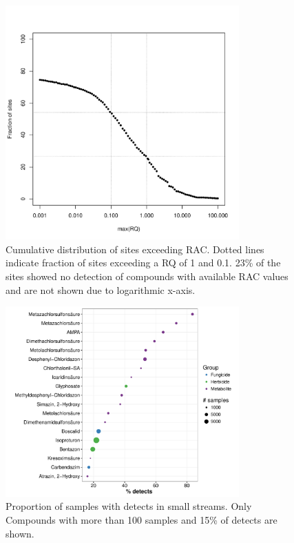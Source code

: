 \documentclass[pdftex,
	a4paper,
	titlepage=false]{scrreprt}
\begin{document}
\begin{figure}[ht]
	\centering
	\includegraphics[width = 0.8\textwidth]{prac_ex}
	\caption[Cumulative distribution of the number sites exceeding RAC.]{Cumulative distribution of sites exceeding RAC. Dotted lines indicate fraction of sites exceeding a RQ of 1 and 0.1. 23\% of the sites showed no detection of compounds with available RAC values and are not shown due to logarithmic x-axis.}
	\label{fig:prac_ex}
\end{figure}


\begin{figure}[ht]
	\centering
	\includegraphics[width = 0.8\textwidth]{pdetects}
	\caption[Proportion of samples with detects in small streams.]{Proportion of samples with detects in small streams. Only Compounds with more than 100 samples and 15\% of detects are shown.}
	\label{fig:pdetects}
\end{figure}
\end{document}
